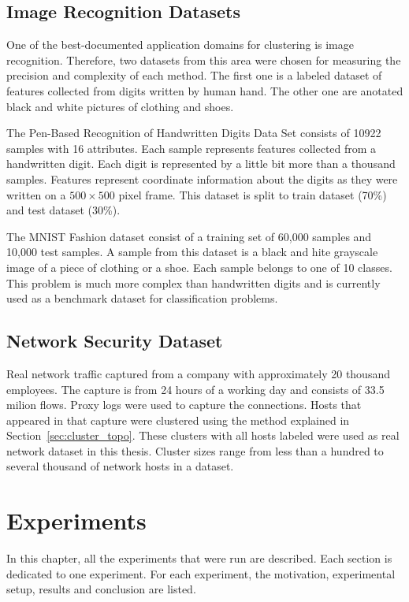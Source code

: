 \documentclass[thesis=B,english]{FITthesis}[2012/10/20]
\begin{document}
\section{Image Recognition Datasets}
One of the best-documented application domains for clustering is image recognition.
Therefore, two datasets from this area were chosen for measuring the precision and complexity of each method.
The first one is a labeled dataset of features collected from digits written by human hand.
The other one are anotated black and white pictures of clothing and shoes.

The Pen-Based Recognition of Handwritten Digits Data Set \cite{dua1998pendigit} consists of 10922 samples with 16 attributes.
Each sample represents features collected from a handwritten digit.
Each digit is represented by a little bit more than a thousand samples.
Features represent coordinate information about the digits as they were written on a $500\times500$ pixel frame.
This dataset is split to train dataset (70\%) and test dataset (30\%).

The MNIST Fashion dataset \cite{xiao2017fashion} consist of a training set of 60,000 samples and 10,000 test samples.
A sample from this dataset is a black and hite grayscale image of a piece of clothing or a shoe.
Each sample belongs to one of 10 classes.
This problem is much more complex than handwritten digits and is currently used as a benchmark dataset for classification problems.

\section{Network Security Dataset}\label{sec:real-data}
Real network traffic captured from a company with approximately 20 thousand employees.
The capture is from 24 hours of a working day and consists of 33.5 milion flows.
Proxy logs were used to capture the connections.
Hosts that appeared in that capture were clustered using the method explained in Section~\ref{sec:cluster_topo}.
These clusters with all hosts labeled were used as real network dataset in this thesis.
Cluster sizes range from less than a hundred to several thousand of network hosts in a dataset.


\chapter{Experiments}\label{ch:experiments}
In this chapter, all the experiments that were run are described.
Each section is dedicated to one experiment.
For each experiment, the motivation, experimental setup, results and conclusion are listed.
\end{document}
